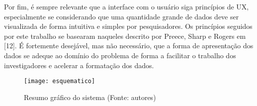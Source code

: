Por fim, é sempre relevante que a interface com o usuário siga princípios de UX, especialmente se considerando que uma quantidade grande de dados deve ser visualizada de forma intuitiva e simples por pesquisadores. Os princípios seguidos por este trabalho se basearam naqueles descrito por Preece, Sharp e Rogers em [12]. É fortemente desejável, mas não necessário, que a forma de apresentação dos dados se adeque ao domínio do problema de forma a facilitar o trabalho dos investigadores e acelerar a formatação dos dados.

\begin{figure}[ht]
  \centering
    \texttt{[image: esquematico]}
  \caption{Resumo gráfico do sistema (Fonte: autores)}
\end{figure}
\FloatBarrier
